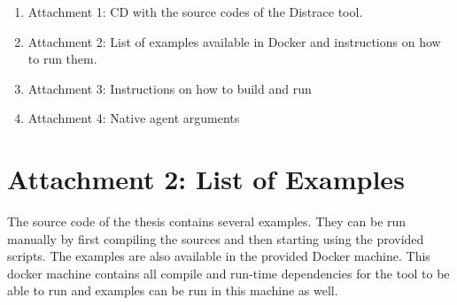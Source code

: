 \documentclass[12pt,a4paper]{report}
\let\openright=\clearpage
\begin{document}


\setcounter{tocdepth}{1}
\tableofcontents











\listoffigures





\begin{enumerate}
	\item Attachment 1: CD with the source codes of the Distrace tool.
	\item Attachment 2: List of examples available in Docker and instructions on how to run them.
	\item Attachment 3: Instructions on how to build and run
	\item Attachment 4: Native agent arguments
	\end{enumerate}
\openright

\setcounter{page}{1}
\chapter*{Attachment 2: List of Examples}
The source code of the thesis contains several examples. They can be run manually by first compiling the sources and then starting using the provided scripts. The examples are also available in the provided Docker machine. This docker machine contains all compile and run-time dependencies for the tool to be able to run and examples can be run in this machine as well.
\end{document}
